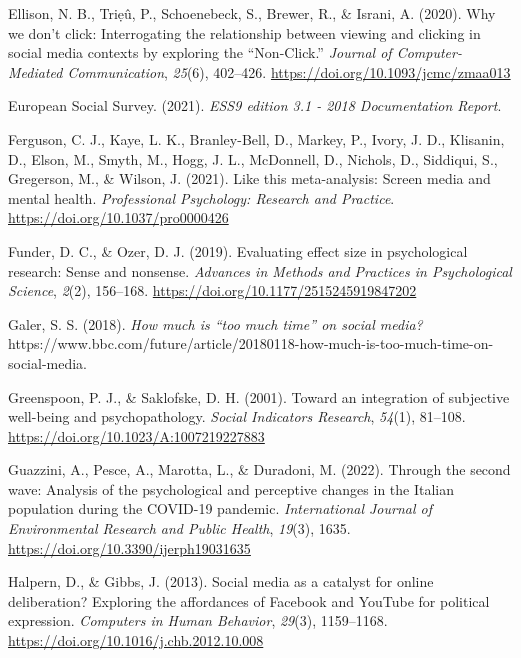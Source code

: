 \documentclass[
  man,mask]{apa7}
\newlength{\cslhangindent}
\newlength{\cslentryspacingunit} %
\newenvironment{CSLReferences}[2] %
 {%
  \setlength{\parindent}{0pt}
  \ifodd #1
  \let\oldpar\par
  \def\par{\hangindent=\cslhangindent\oldpar}
  \fi
  \setlength{\parskip}{#2\cslentryspacingunit}
 }%
 {}
\begin{document}
\begin{CSLReferences}{1}{0}
\leavevmode{}%
Ellison, N. B., Triẹû, P., Schoenebeck, S., Brewer, R., \& Israni, A. (2020). Why we don't click: {Interrogating} the relationship between viewing and clicking in social media contexts by exploring the {``{Non-Click}.''} \emph{Journal of Computer-Mediated Communication}, \emph{25}(6), 402--426. \url{https://doi.org/10.1093/jcmc/zmaa013}

\leavevmode{}%
European Social Survey. (2021). \emph{{ESS9} edition 3.1 - 2018 {Documentation Report}}.

\leavevmode{}%
Ferguson, C. J., Kaye, L. K., Branley-Bell, D., Markey, P., Ivory, J. D., Klisanin, D., Elson, M., Smyth, M., Hogg, J. L., McDonnell, D., Nichols, D., Siddiqui, S., Gregerson, M., \& Wilson, J. (2021). Like this meta-analysis: {Screen} media and mental health. \emph{Professional Psychology: Research and Practice}. \url{https://doi.org/10.1037/pro0000426}

\leavevmode{}%
Funder, D. C., \& Ozer, D. J. (2019). Evaluating effect size in psychological research: {Sense} and nonsense. \emph{Advances in Methods and Practices in Psychological Science}, \emph{2}(2), 156--168. \url{https://doi.org/10.1177/2515245919847202}

\leavevmode{}%
Galer, S. S. (2018). \emph{How much is {``too much time''} on social media?} https://www.bbc.com/future/article/20180118-how-much-is-too-much-time-on-social-media.

\leavevmode{}%
Greenspoon, P. J., \& Saklofske, D. H. (2001). Toward an integration of subjective well-being and psychopathology. \emph{Social Indicators Research}, \emph{54}(1), 81--108. \url{https://doi.org/10.1023/A:1007219227883}

\leavevmode{}%
Guazzini, A., Pesce, A., Marotta, L., \& Duradoni, M. (2022). Through the second wave: {Analysis} of the psychological and perceptive changes in the {Italian} population during the {COVID-19} pandemic. \emph{International Journal of Environmental Research and Public Health}, \emph{19}(3), 1635. \url{https://doi.org/10.3390/ijerph19031635}

\leavevmode{}%
Halpern, D., \& Gibbs, J. (2013). Social media as a catalyst for online deliberation? {Exploring} the affordances of {Facebook} and {YouTube} for political expression. \emph{Computers in Human Behavior}, \emph{29}(3), 1159--1168. \url{https://doi.org/10.1016/j.chb.2012.10.008}


\end{CSLReferences}
\end{document}
